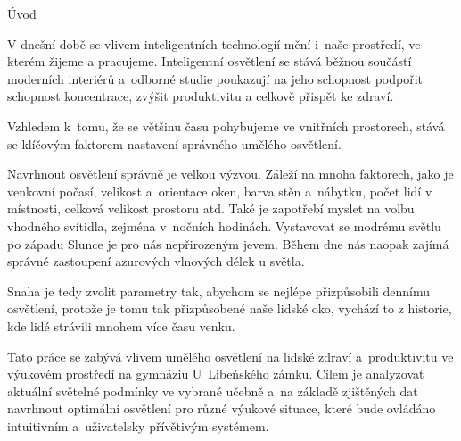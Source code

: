 \nonum\chap Úvod

V dnešní době se vlivem inteligentních technologií mění i~naše prostředí, ve kterém žijeme a pracujeme.
Inteligentní osvětlení se stává běžnou součástí moderních interiérů a~odborné studie poukazují na jeho schopnost
podpořit schopnost koncentrace, zvýšit produktivitu a celkově přispět ke zdraví.

Vzhledem k~tomu, že se většinu času pohybujeme ve vnitřních prostorech,
stává se klíčovým faktorem nastavení správného umělého osvětlení.

Navrhnout osvětlení správně je velkou výzvou. Záleží na mnoha faktorech, jako je
venkovní počasí, velikost a~orientace oken, barva stěn a~nábytku, počet lidí v místnosti,
celková velikost prostoru atd. Také je zapotřebí myslet na volbu vhodného svítidla, zejména v~nočních hodinách.
Vystavovat se modrému světlu po západu Slunce je pro nás nepřirozeným jevem. Během dne nás naopak zajímá správné
zastoupení azurových vlnových délek u světla. 

Snaha je tedy zvolit parametry tak, abychom se nejlépe přizpůsobili dennímu osvětlení, protože je tomu tak
přizpůsobené naše lidské oko, vychází to z historie, kde lidé strávili mnohem více času venku.



Tato práce se zabývá vlivem umělého osvětlení na lidské zdraví a~produktivitu ve výukovém prostředí na
gymnáziu U~Libeňského zámku. Cílem je analyzovat aktuální světelné podmínky ve vybrané učebně
a~na základě zjištěných dat navrhnout optimální osvětlení pro různé výukové situace, které bude ovládáno
intuitivním a~uživatelsky přívětivým systémem.


\medskip \medskip \medskip

